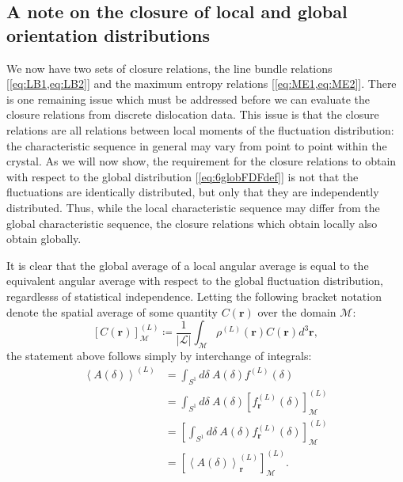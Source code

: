 \subsection{A note on the closure of local and global orientation
distributions}

We now have two sets of closure relations, the line bundle relations [\cref{eq:LB1,eq:LB2}] and the maximum entropy relations [\cref{eq:ME1,eq:ME2}]. There is one remaining issue which must be addressed before we can evaluate the closure relations from discrete dislocation data. This issue is that the closure relations are all relations between local moments of the fluctuation distribution: the characteristic sequence in general may vary from point to point within the crystal. As we will now show, the requirement for the closure relations to obtain with respect to the global distribution [\cref{eq:6globFDFdef}] is not that the fluctuations are identically distributed, but only that they are independently distributed. Thus, while the local characteristic sequence may differ from the global characteristic sequence, the closure relations which obtain locally also obtain globally.

It is clear that the global average of a local angular average is equal to the equivalent angular average with respect to the global fluctuation distribution, regardlesss of statistical independence. Letting the following bracket notation denote the spatial average of some quantity $C\left( \boldsymbol{r}\right)$ over the domain $\mathcal{M}$:
\begin{equation}
    \left\lbrack C\left( \boldsymbol{r} \right) \right\rbrack_{\mathcal{M}}^{(L)} \coloneqq \frac{1}{\left| \mathcal{L} \right|}\int_{\mathcal{M}}^{}\rho^{(L)}\left( \boldsymbol{r} \right)C\left( \boldsymbol{r} \right)d^{3}\boldsymbol{r},
\end{equation}
the statement above follows simply by interchange of integrals:
\begin{subequations}
\begin{align}
    \left\langle A(\delta) \right\rangle^{(L)} &= \int_{S^{1}}^{}{d\delta\ A(\delta)}f^{(L)}(\delta)\\
    &= \int_{S^{1}}^{}{d\delta\ A(\delta)}\left\lbrack f_{\boldsymbol{r}}^{(L)}(\delta) \right\rbrack_{\mathcal{M}}^{(L)}\\
    &= \left\lbrack \int_{S^{1}}^{}{d\delta\ A(\delta)f_{\boldsymbol{r}}^{(L)}(\delta)} \right\rbrack_{\mathcal{M}}^{(L)}\\
    &= \left\lbrack \left\langle A(\delta) \right\rangle_{\boldsymbol{r}}^{(L)} \right\rbrack_{\mathcal{M}}^{(L)}.
\end{align}\label{eq:interchangeofav}
\end{subequations}

